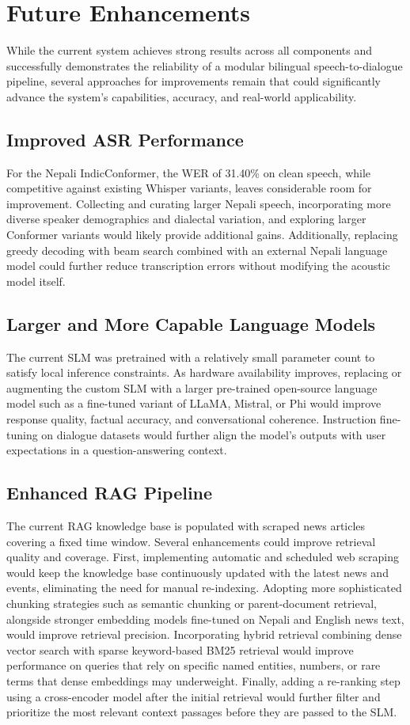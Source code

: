\newpage
\section{Future Enhancements}

While the current system achieves strong results across all components and successfully demonstrates the reliability of a modular bilingual speech-to-dialogue pipeline, several approaches for improvements remain that could significantly advance the system's capabilities, accuracy, and real-world applicability.

\subsection{Improved ASR Performance}
For the Nepali IndicConformer, the WER of 31.40\% on clean speech, while competitive against existing Whisper variants, leaves considerable room for improvement. Collecting and curating larger Nepali speech, incorporating more diverse speaker demographics and dialectal variation, and exploring larger Conformer variants would likely provide additional gains. Additionally, replacing greedy decoding with beam search combined with an external Nepali language model could further reduce transcription errors without modifying the acoustic model itself.

\subsection{Larger and More Capable Language Models}
The current SLM was pretrained with a relatively small parameter count to satisfy local inference constraints. As hardware availability improves, replacing or augmenting the custom SLM with a larger pre-trained open-source language model such as a fine-tuned variant of LLaMA, Mistral, or Phi would improve response quality, factual accuracy, and conversational coherence. Instruction fine-tuning on dialogue datasets would further align the model's outputs with user expectations in a question-answering context.

\subsection{Enhanced RAG Pipeline}
The current RAG knowledge base is populated with scraped news articles covering a fixed time window. Several enhancements could improve retrieval quality and coverage. First, implementing automatic and scheduled web scraping would keep the knowledge base continuously updated with the latest news and events, eliminating the need for manual re-indexing. Adopting more sophisticated chunking strategies such as semantic chunking or parent-document retrieval, alongside stronger embedding models fine-tuned on Nepali and English news text, would improve retrieval precision. Incorporating hybrid retrieval combining dense vector search with sparse keyword-based BM25 retrieval would improve performance on queries that rely on specific named entities, numbers, or rare terms that dense embeddings may underweight. Finally, adding a re-ranking step using a cross-encoder model after the initial retrieval would further filter and prioritize the most relevant context passages before they are passed to the SLM.

